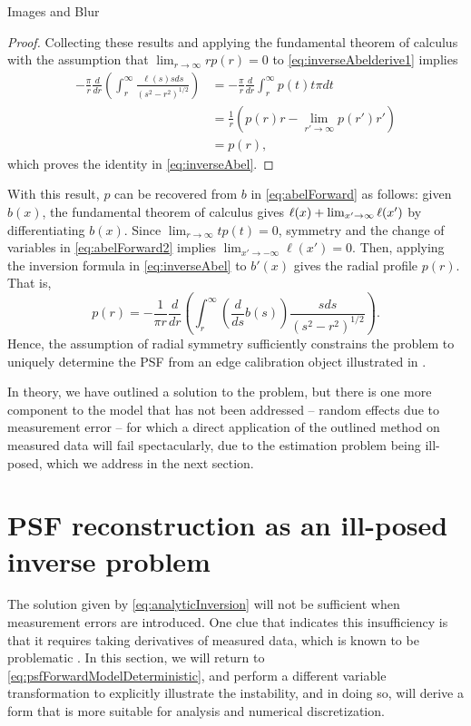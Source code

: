 \begin{chapter}{Images and Blur}
\begin{proof}
  Collecting these results and applying the fundamental theorem of calculus with the assumption that $\lim_{r\to\infty}rp(r) = 0$ to \eqref{eq:inverseAbelderive1} implies
  \begin{align}
    -\frac{\pi}{r} \frac{d}{dr} \left(\int_r^\infty \frac{\ell(s) s ds}{ (s^2 - r^2)^{1/2} } \right) 
      &= -\frac{\pi}{r} \frac{d}{dr} \int_r^\infty p(t) t \pi dt \nonumber\\
      &= \frac{1}{r} \left(p(r)r - \lim_{r'\to\infty}p(r')r'\right) \nonumber\\
      &= p(r),
  \end{align}
  which proves the identity in \eqref{eq:inverseAbel}.
\end{proof}
  
  With this result, $p$ can be recovered from $b$ in \eqref{eq:abelForward} as follows: given $b(x)$, the fundamental theorem of calculus gives $\ell(x) + \lim_{x'\to\-\infty}\ell(x')$ by differentiating $b(x)$.
  Since $\lim_{r\to\infty}tp(t) = 0$, symmetry and the change of variables in \eqref{eq:abelForward2} implies $\lim_{x'\to-\infty}\ell(x') = 0$. 
  Then, applying the inversion formula in \eqref{eq:inverseAbel} to $b'(x)$ gives the radial profile $p(r)$.
  That is,
  \begin{equation} \label{eq:analyticInversion}
    p(r) = -\frac{1}{\pi r} \frac{d}{dr}\left(\int_r^\infty \left(\frac{d}{ds} b(s)\right) \frac{ s ds}{ (s^2 - r^2)^{1/2} } \right).  
  \end{equation}
  Hence, the assumption of radial symmetry sufficiently constrains the problem to uniquely determine the PSF from an edge calibration object illustrated in .

  In theory, we have outlined a solution to the problem, but there is one more component to the model that has not been addressed -- random effects due to measurement error -- for which a direct application of the outlined method on measured data will fail spectacularly, due to the estimation problem being ill-posed, which we address in the next section.

\section{PSF reconstruction as an ill-posed inverse problem}
  
  The solution given by \eqref{eq:analyticInversion} will not be sufficient when measurement errors are introduced. 
  One clue that indicates this insufficiency is that it requires taking derivatives of measured data, which is known to be problematic \citep{hanke2001}.
  In this section, we will return to \eqref{eq:psfForwardModelDeterministic}, and perform a different variable transformation to explicitly illustrate the instability, and in doing so, will derive a form that is more suitable for analysis and numerical discretization.


\end{chapter}

